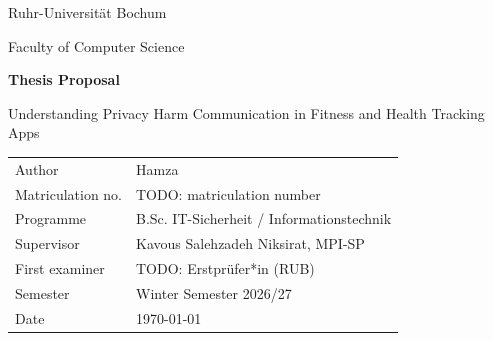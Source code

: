 \documentclass[11pt,a4paper]{article}
\newcommand{\thesistitle}{Understanding Privacy Harm Communication in Fitness and Health Tracking Apps}
\newcommand{\thesissubtitle}{Thesis Proposal}
\newcommand{\authorname}{Hamza}
\newcommand{\matriculation}{TODO: matriculation number}
\newcommand{\firstexaminer}{TODO: Erstprüfer*in (RUB)}
\newcommand{\supervisorname}{Kavous Salehzadeh Niksirat, MPI-SP}
\newcommand{\thefaculty}{Faculty of Computer Science}
\newcommand{\theuniversity}{Ruhr-Universität Bochum}
\newcommand{\theprogram}{B.Sc. IT-Sicherheit / Informationstechnik}
\newcommand{\thesemester}{Winter Semester 2026/27}
\begin{document}
\begin{titlepage}
\centering
\vspace*{2cm}

{\Large \theuniversity\par}
{\large \thefaculty\par}
\vspace{2.5cm}

{\Huge\bfseries \thesissubtitle\par}
\vspace{1cm}
{\LARGE \thesistitle\par}

\vspace{3cm}
\begin{tabular}{@{}ll@{}}
Author            & \authorname \\
Matriculation no. & \matriculation \\
Programme         & \theprogram \\[1em]
Supervisor        & \supervisorname \\
First examiner    & \firstexaminer \\[1em]
Semester          & \thesemester \\
Date              & \today \\
\end{tabular}

\vfill
\end{titlepage}

\begin{abstract}
\noindent

\end{abstract}

\newpage
\tableofcontents
\newpage









\newpage
\printbibliography[heading=bibintoc,title={References}]
\end{document}
